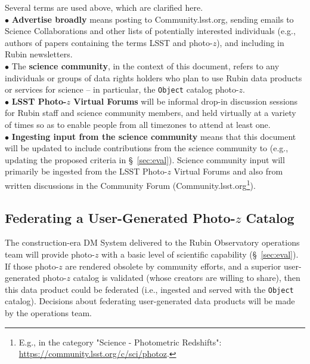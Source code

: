 \documentclass[DM,lsstdraft,toc]{lsstdoc}
\begin{document}
Several terms are used above, which are clarified here. \\
$\bullet$ {\bf Advertise broadly} means posting to Community.lsst.org, sending emails to Science Collaborations and other lists of potentially interested individuals (e.g., authors of papers containing the terms LSST and photo-$z$), and including in Rubin newsletters. \\
$\bullet$ The {\bf science community}, in the context of this document, refers to any individuals or groups of data rights holders who plan to use Rubin data products or services for science -- in particular, the {\tt Object} catalog photo-$z$. \\
$\bullet$ {\bf LSST Photo-$z$ Virtual Forums} will be informal drop-in discussion sessions for Rubin staff and science community members, and held virtually at a variety of times so as to enable people from all timezones to attend at least one. \\
$\bullet$ {\bf Ingesting input from the science community} means that this document will be updated to include contributions from the science community to (e.g., updating the proposed criteria in \S~\ref{sec:eval}).
Science community input will primarily be ingested from the LSST Photo-$z$ Virtual Forums and also from written discussions in the Community Forum (Community.lsst.org\footnote{E.g., in the category "Science - Photometric Redshifts": \url{https://community.lsst.org/c/sci/photoz}.}).

\subsection{Federating a User-Generated Photo-$z$ Catalog}\label{ssec:time_ops_ugfed}

The construction-era DM System delivered to the Rubin Observatory operations team will provide photo-$z$ with a basic level of scientific capability (\S~\ref{sec:eval}). 
If those photo-$z$ are rendered obsolete by community efforts, and a superior user-generated photo-$z$ catalog is validated (whose creators are willing to share), then this data product could be federated (i.e., ingested and served with the {\tt Object} catalog).
Decisions about federating user-generated data products will be made by the operations team.
\end{document}
